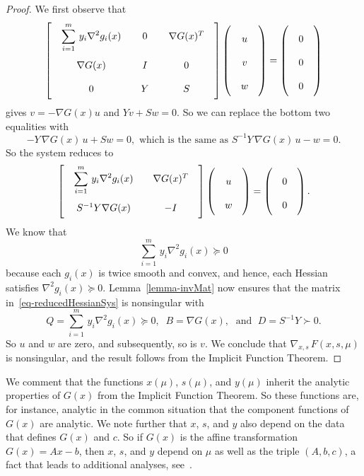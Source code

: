 \documentclass{article}
\def\pd{\succ}
\def\psd{\succeq}
\begin{document}
\begin{proof}
We first observe that
\[
\left[ 
    \renewcommand{\arraystretch}{2}
    \renewcommand{\arraycolsep}{10pt}
    \begin{array}{ccc}
    \displaystyle \sum_{i=1}^m \, y_i \nabla^2 g_i(x) & 0 &
       \nabla G(x)^T \\
    \nabla G(x) & I & 0 \\
    0 & Y & S
    \end{array} \right]
    \left( \begin{array}{c} u \\ v \\ w \end{array} \right)
    = \left( \begin{array}{c} 0 \\ 0 \\ 0 \end{array} \right)
\]
gives $v = -\nabla G(x) u$ and $Yv + Sw = 0$. So we can replace
the bottom two equalities with 
\[
-Y \, \nabla G(x) \, u + Sw = 0, \mbox{ which is the same as }
    S^{-1} Y \, \nabla G(x) \, u - w = 0. 
\]
So the system reduces to
\begin{equation} \label{eq-reducedHessianSys}
\left[ 
    \renewcommand{\arraystretch}{2}
    \renewcommand{\arraycolsep}{10pt}
    \begin{array}{cc}
    \displaystyle \sum_{i=1}^m \, y_i \nabla^2 g_i(x) & 
        \nabla G(x)^T \\
    S^{-1}Y \nabla G(x) & -I 
    \end{array} \right]
    \left( \begin{array}{c} u \\ w \end{array} \right)
    = \left( \begin{array}{c} 0 \\ 0 \end{array} \right).
\end{equation}
We know that
\[
\sum_{i=1}^m \, y_i \nabla^2 g_i(x) \psd 0
\]
because each $g_i(x)$ is twice smooth and convex, and hence, each 
Hessian satisfies $\nabla^2 g_i(x) \psd 0$. Lemma~\ref{lemma-invMat}
now ensures that the matrix in~\eqref{eq-reducedHessianSys} is 
nonsingular with
\[
Q = \sum_{i=1}^m \, y_i \nabla^2 g_i(x) \psd 0, \;\;
B = \nabla G(x), \; \mbox{ and } \; D = S^{-1}Y \pd 0.
\]
So $u$ and $w$ are zero, and subsequently, so is $v$.
We conclude that $\nabla_{x,s} \, F(x,s,\mu)$ is nonsingular,
and the result follows from the Implicit Function Theorem.
\end{proof}
We comment that the functions $x(\mu)$, $s(\mu)$, and $y(\mu)$
inherit the analytic properties of $G(x)$ from the Implicit
Function Theorem. So these functions are, for instance,
analytic in the common situation that the component functions of 
$G(x)$ are analytic. We note further that $x$, $s$, and $y$ also 
depend on the data that defines $G(x)$ and $c$. So if $G(x)$ is
the affine transformation $G(x) = Ax - b$, then $x$, $s$, and $y$
depend on $\mu$ as well as the triple $(A,b,c)$, a fact that leads
to additional analyses, see~\cite{holder04,sonnevend86}.
\end{document}
